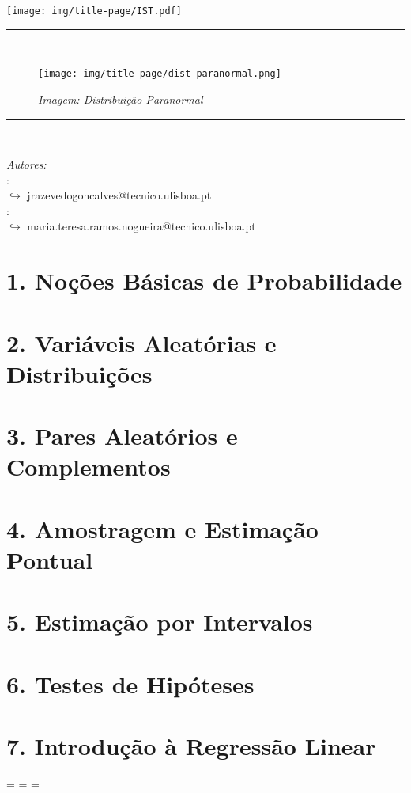 \documentclass[a4paper,12pt]{article}
\makeatletter
\let\zzzfootnotesize\footnotesize
\def\newfootnotesize{%
\zzzfootnotesize
\abovedisplayskip=0pt
\belowdisplayskip=\abovedisplayskip
\abovedisplayshortskip=\abovedisplayskip
\belowdisplayshortskip=\abovedisplayskip
}
\renewcommand\footnotesize{\protect\newfootnotesize}
\def\maketitle{
  \begin{center}\leavevmode
        \normalfont
        \texttt{[image: img/title-page/IST.pdf]}
        \vskip 0.05cm   
        \textsc{\large \department}\\
        \vskip 0.5cm
        \rule{0.95\linewidth}{0.2 mm} %
        {\large \exam}\\[0.5 cm]
        {\huge \bfseries \@title \par} 
        \vspace{1em}
        \begin{figure}[!h]  
            \centering
            \texttt{[image: img/title-page/dist-paranormal.png]}
            \caption*{\color{gray} \textit{Imagem: Distribuição Paranormal}} 
            \label{fig:curvas} 
        \end{figure}
        \rule{0.95\linewidth}{0.2 mm} \\[0.75 cm]
        \begin{minipage}[t]{1\textwidth}
	   \begin{flushleft} \large
                \emph{Autores:}\\
			\normalsize \textbf{\@author} : \studentID\\
                \fontsize{9pt}{11pt}\selectfont $\hookrightarrow$ jrazevedogoncalves@tecnico.ulisboa.pt \\
                \normalsize \textbf{\authorr} : \studentIDD\\
                \scriptsize $\hookrightarrow$ maria.teresa.ramos.nogueira@tecnico.ulisboa.pt
		\end{flushleft}
	\end{minipage}
	\vfill
	{\Large \@date\par}
   \end{center}
   \cleardoublepage
  }
\makeatother
\begin{document}
%
    \sloppy
    \maketitle
    \tableofcontents
    \newpage
    \pagestyle{fancy}
    
    \clearpage
    \section{1. Noções Básicas de Probabilidade}%
        
        
        

    \clearpage
    \section{2. Variáveis Aleatórias e Distribuições}
        

    \clearpage
    \section{3. Pares Aleatórios e Complementos}
        
        
        
        
        

    \clearpage
    \section{4. Amostragem e Estimação Pontual}
        
        

    \clearpage
    \section{5. Estimação por Intervalos}
        
        

    \clearpage
    \section{6. Testes de Hipóteses}
        

    \clearpage{}
    \section{7. Introdução à Regressão Linear}
        

    \clearpage
    
    \nocite{*}
    {\footnotesize%
    }
\end{document}
